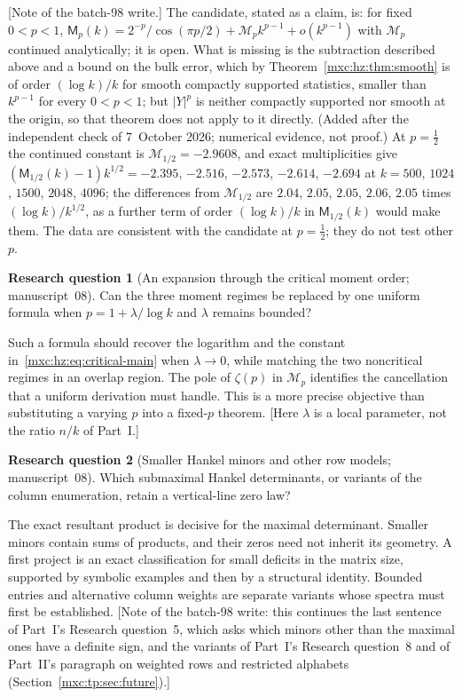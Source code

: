 \documentclass[11pt]{article}
\numberwithin{equation}{section}
\theoremstyle{definition}
\newtheorem{question}{Research question}
\theoremstyle{remark}
\begin{document}
[Note of the batch-98 write.] The candidate, stated as a claim, is: for
fixed $0<p<1$,
$\mathsf M_p(k)=2^{-p}/\cos(\pi p/2)+\mathcal M_pk^{p-1}+o(k^{p-1})$ with
$\mathcal M_p$ continued analytically; it is open. What is missing is the
subtraction described above and a bound on the bulk error, which by
Theorem~\ref{mxc:hz:thm:smooth} is of order $(\log k)/k$ for smooth
compactly supported statistics, smaller than $k^{p-1}$ for every
$0<p<1$; but $|Y|^p$ is neither compactly supported nor smooth at the
origin, so that theorem does not apply to it directly.
\textup{(Added after the independent check of 7~October 2026; numerical
evidence, not proof.)} At $p=\frac12$ the continued constant is
$\mathcal M_{1/2}=-2.9608$, and exact multiplicities give
$(\mathsf M_{1/2}(k)-1)k^{1/2}=-2.395$, $-2.516$, $-2.573$, $-2.614$,
$-2.694$ at $k=500$, $1024$, $1500$, $2048$, $4096$; the differences from
$\mathcal M_{1/2}$ are $2.04$, $2.05$, $2.05$, $2.06$, $2.05$ times
$(\log k)/k^{1/2}$, as a further term of order $(\log k)/k$ in
$\mathsf M_{1/2}(k)$ would make them. The data are consistent with the
candidate at $p=\frac12$; they do not test other $p$.

\begin{question}[An expansion through the critical moment order; manuscript~08]\label{mxc:hz:q:critical}
Can the three moment regimes be replaced by one uniform formula when
$p=1+\lambda/\log k$ and $\lambda$ remains bounded?
\end{question}

Such a formula should recover the logarithm and the constant
in~\eqref{mxc:hz:eq:critical-main} when $\lambda\to0$, while matching the
two noncritical regimes in an overlap region. The pole of $\zeta(p)$ in
$\mathcal M_p$ identifies the cancellation that a uniform derivation must
handle. This is a more precise objective than substituting a varying $p$
into a fixed-$p$ theorem. [Here $\lambda$ is a local parameter, not the
ratio $n/k$ of Part~I.]

\begin{question}[Smaller Hankel minors and other row models; manuscript~08]\label{mxc:hz:q:minors}
Which submaximal Hankel determinants, or variants of the column
enumeration, retain a vertical-line zero law?
\end{question}

The exact resultant product is decisive for the maximal determinant.
Smaller minors contain sums of products, and their zeros need not inherit
its geometry. A first project is an exact classification for small
deficits in the matrix size, supported by symbolic examples and then by a
structural identity. Bounded entries and alternative column weights are
separate variants whose spectra must first be established. [Note of the
batch-98 write: this continues the last sentence of Part~I's Research
question~5, which asks which minors other than the maximal ones have a
definite sign, and the variants of Part~I's Research question~8 and of
Part~II's paragraph on weighted rows and restricted alphabets
(Section~\ref{mxc:tp:sec:future}).]
\end{document}
